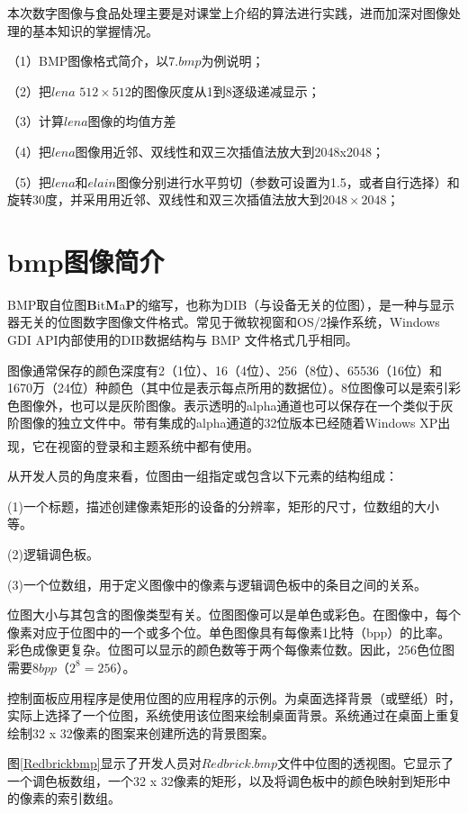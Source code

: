 \documentclass[UTF8]{ctexart}
\newcommand{\upcite}[1]{\textsuperscript{\textsuperscript{\cite{#1}}}}
\begin{document}
本次数字图像与食品处理主要是对课堂上介绍的算法进行实践，进而加深对图像处理的基本知识的掌握情况。

（1）BMP图像格式简介，以$7.bmp$为例说明；

（2）把$lena$ $512 \times 512$的图像灰度从1到8逐级递减显示；

（3）计算$lena$图像的均值方差

（4）把$lena$图像用近邻、双线性和双三次插值法放大到2048x2048；

（5）把$lena$和$elain$图像分别进行水平剪切（参数可设置为1.5，或者自行选择）和旋转30度，并采用用近邻、双线性和双三次插值法放大到$2048\times2048$；

\section{bmp图像简介}
BMP取自位图\textbf{B}it\textbf{M}a\textbf{P}的缩写，也称为DIB（与设备无关的位图），是一种与显示器无关的位图数字图像文件格式。常见于微软视窗和OS/2操作系统，Windows GDI API内部使用的DIB数据结构与 BMP 文件格式几乎相同。

图像通常保存的颜色深度有2（1位）、16（4位）、256（8位）、65536（16位）和1670万（24位）种颜色（其中位是表示每点所用的数据位）。8位图像可以是索引彩色图像外，也可以是灰阶图像。表示透明的alpha通道也可以保存在一个类似于灰阶图像的独立文件中。带有集成的alpha通道的32位版本已经随着Windows XP出现，它在视窗的登录和主题系统中都有使用\upcite{MSdoc}。

从开发人员的角度来看，位图由一组指定或包含以下元素的结构组成：

(1)一个标题，描述创建像素矩形的设备的分辨率，矩形的尺寸，位数组的大小等。

(2)逻辑调色板。

(3)一个位数组，用于定义图像中的像素与逻辑调色板中的条目之间的关系。

位图大小与其包含的图像类型有关。位图图像可以是单色或彩色。在图像中，每个像素对应于位图中的一个或多个位。单色图像具有每像素1比特（bpp）的比率。彩色成像更复杂。位图可以显示的颜色数等于两个每像素位数。因此，256色位图需要8$bpp$（$2 ^ 8 = 256$）。

控制面板应用程序是使用位图的应用程序的示例。为桌面选择背景（或壁纸）时，实际上选择了一个位图，系统使用该位图来绘制桌面背景。系统通过在桌面上重复绘制32 x 32像素的图案来创建所选的背景图案。

图\ref{Redbrickbmp}显示了开发人员对$Redbrick.bmp$文件中位图的透视图。它显示了一个调色板数组，一个32 x 32像素的矩形，以及将调色板中的颜色映射到矩形中的像素的索引数组。
\end{document}
